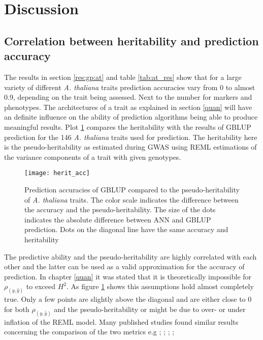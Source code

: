 \section{Discussion}\label{gpdis}
\subsection{Correlation between heritability and prediction accuracy}

The results in section \ref{res:gp:at} and table \ref{tab:at_res} show that for a large
variety of different \textit{A. thaliana} traits prediction accuracies vary from 0 to
almost 0.9, depending on the trait being assessed. Next to the number for markers and
phenotypes. The architectures of a trait as explained in section \ref{quan} will have an
definite influence on the ability of prediction algorithms being able to produce
meaningful results. Plot \ref{fig:herit_gp} compares the heritability with the results of
GBLUP prediction for the 146 \textit{A. thaliana} traits used for prediction. The
heritability here is the pseudo-heritability as estimated during GWAS using REML
estimations of the variance components of a trait with given genotypes. 

\begin{figure}[H]
 \centering \texttt{[image: herit\_acc]}
 \decoRule
 \caption[Prediction accuracies of GBLUP compared to the heritability of
 \textit{A. thaliana} traits]{Prediction accuracies of GBLUP compared to the
   pseudo-heritability of \textit{A. thaliana} traits. The color scale indicates the
   difference between the accuracy and the pseudo-heritability. The size of the dots
   indicates the absolute difference between ANN and GBLUP prediction. Dots on the
   diagonal line have the same accuracy and heritability}
\label{fig:herit_gp}
\end{figure}

The predictive ability and the pseudo-heritability are highly correlated with each other
and the latter can be used as a valid approximation for the accuracy of prediction. In
chapter \ref{quan} it was stated that it is theoretically impossible for
$\rho_{(y,\hat{y})}$ to exceed $H^2$. As figure \ref{fig:herit_gp} shows this assumptions
hold almost completely true. Only a few points are slightly above the diagonal and are
either close to 0 for both $\rho_{(y,\hat{y})}$ and the pseudo-heritability or might be
due to over- or under inflation of the REML model. Many published studies found similar
results concerning the comparison of the two metrics e.g \cite{kwong2017genomic}; \cite{morgante2018effect}; \cite{yap2018misestimation}; \cite{piaskowski2018genomic}; \cite{zhang2019factors}


